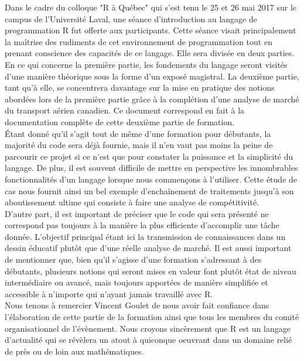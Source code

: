 Dans le cadre du colloque "R à Québec" qui s'est tenu le 25 et 26 mai 2017 sur le campus de l'Université Laval, une séance d'introduction au langage de programmation R fut offerte aux participants. Cette séance visait principalement la maîtrise des rudiments de cet environnement de programmation tout en prenant conscience des capacités de ce langage. \cite{RQC2017} Elle sera divisée en deux parties. En ce qui concerne la première partie, les fondements du langage seront visités d'une manière théorique sous la forme d'un exposé magistral. La deuxième partie, tant qu'à elle, se concentrera davantage sur la mise en pratique des notions abordées lors de la première partie grâce à la complétion d'une analyse de marché du transport aérien canadien. Ce document correspond en fait à la documentation complète de cette deuxième partie de formation. \\

Étant donné qu'il s'agit tout de même d'une formation pour débutants, la majorité du code sera déjà fournie, mais il n'en vaut pas moins la peine de parcourir ce projet si ce n'est que pour constater la puissance et la simplicité du langage. De plus, il est souvent difficile de mettre en perspective les innombrables fonctionnalités d'un langage lorsque nous commençons à l'utiliser. Cette étude de cas nous fournit ainsi un bel exemple d'enchaînement de traitements jusqu'à son aboutissement ultime qui consiste à faire une analyse de compétitivité. \\

D'autre part, il est important de préciser que le code qui sera présenté ne correspond pas toujours à la manière la plus efficiente d'accomplir une tâche donnée. L'objectif principal étant ici la transmission de connaissances dans un dessin éducatif plutôt que d'une réelle analyse de marché. Il est aussi important de mentionner que, bien qu'il s'agisse d'une formation s'adressant à des débutants, plusieurs notions qui seront mises en valeur font plutôt état de niveau intermédiaire ou avancé, mais toujours apportées de manière simplifiée et accessible à n'importe qui n'ayant jamais travaillé avec R. \\

Nous tenons à remercier Vincent Goulet de nous avoir fait confiance dans l'élaboration de cette partie de la formation ainsi que tous les membres du comité organisationnel de l'évènement. Nous croyons sincèrement que R est un langage d'actualité qui se révèlera un atout à quiconque oeuvrant dans un domaine relié de près ou de loin aux mathématiques.